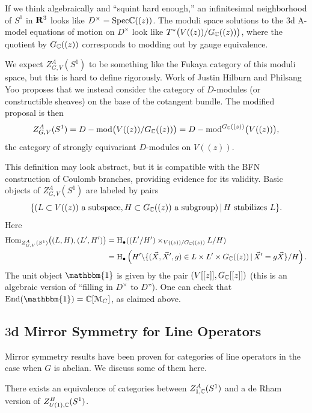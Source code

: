 If we think algebraically and ``squint hard enough,'' an infinitesimal neighborhood of $S^1$ in $\mathbf{R}^3$ looks like $D^\times = \mathrm{Spec} \mathbb{C}((z))$.
The moduli space solutions to the $3$d A-model equations of motion on $D^\times$ look like $T^*\big(V((z)) / G_{\mathbb{C}}((z)) \big)$, where the quotient by $G_{\mathbb{C}}((z))$ corresponds to modding out by gauge equivalence.

We expect $Z^A_{G,V}(S^1)$ to be something like the Fukaya category of this moduli space, but this is hard to define rigorously.
Work of Justin Hilburn and Philsang Yoo proposes that we instead consider the category of $D$-modules (or constructible sheaves) on the base of the cotangent bundle.
The modified proposal is then
\begin{equation}
Z^A_{G,V}(S^1) = D-{\rm{mod}}\big(V((z)) / G_{\mathbb{C}}((z))\big) = D-{\rm{mod}}^{G_{\mathbb{C}}((z))}\big(V((z))\big),
\end{equation}
the category of strongly equivariant $D$-modules on $V((z))$.

This definition may look abstract, but it is compatible with the BFN construction of Coulomb branches, providing evidence for its validity.
Basic objects of $Z^A_{G,V}(S^1)$ are labeled by pairs
\begin{equation}
\{ (L \subset V((z)) \textrm{ a subspace}, H \subset G_{\mathbb{C}}((z))\textrm{ a subgroup}) \, | \, H \textrm{ stabilizes } L \}.
\end{equation}
Here
\begin{align}
\mathrm{Hom}_{Z^A_{G,V}(S^1)}\big((L, H), (L', H')\big) &= \mathrm{H}_\bullet((L' / H') \times_{V((z)) / G_{\mathbb{C}}((z))} L / H) \\
&= \mathrm{H}_\bullet \left(H' \backslash \{ (\vec{X}, \vec{X}', g) \in L \times L' \times G_{\mathbb{C}}((z)) \, | \, \vec{X}' = g \vec{X} \} / H\right).
\end{align}
The unit object $\mathbbm{1}$ is given by the pair $(V[[z]], G_{\mathbb{C}}[[z]])$ (this is an algebraic version of ``filling in $D^\times$ to $D$'').
One can check that $\mathrm{End}(\mathbbm{1}) = \C[\cM_C]$, as claimed above.

\subsection{$3$d Mirror Symmetry for Line Operators}

Mirror symmetry results have been proven for categories of line operators in the case when $G$ is abelian.
We discuss some of them here.

\begin{Theorem}
There exists an equivalence of categories between $Z^A_{1,\mathbb{C}}(S^1)$ and a de Rham version of $Z^B_{U(1), \mathbb{C}}(S^1)$.
\end{Theorem}

